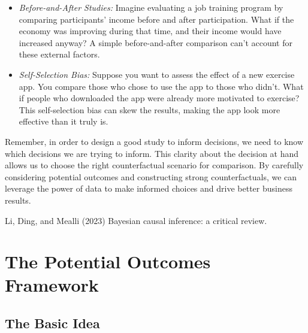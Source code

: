 \documentclass[
  letterpaper,
  DIV=11,
  numbers=noendperiod]{scrreprt}
\begin{document}
\begin{itemize}
\item
  \emph{Before-and-After Studies:} Imagine evaluating a job training
  program by comparing participants' income before and after
  participation. What if the economy was improving during that time, and
  their income would have increased anyway? A simple before-and-after
  comparison can't account for these external factors.
\item
  \emph{Self-Selection Bias:} Suppose you want to assess the effect of a
  new exercise app. You compare those who chose to use the app to those
  who didn't. What if people who downloaded the app were already more
  motivated to exercise? This self-selection bias can skew the results,
  making the app look more effective than it truly is.
\end{itemize}

Remember, in order to design a good study to inform decisions, we need
to know which decisions we are trying to inform. This clarity about the
decision at hand allows us to choose the right counterfactual scenario
for comparison. By carefully considering potential outcomes and
constructing strong counterfactuals, we can leverage the power of data
to make informed choices and drive better business results.

\begin{tcolorbox}[enhanced jigsaw, colframe=quarto-callout-tip-color-frame, left=2mm, toprule=.15mm, colbacktitle=quarto-callout-tip-color!10!white, title=\textcolor{quarto-callout-tip-color}{\faLightbulb}\hspace{0.5em}{Learn more}, coltitle=black, rightrule=.15mm, leftrule=.75mm, colback=white, arc=.35mm, bottomtitle=1mm, bottomrule=.15mm, breakable, titlerule=0mm, opacitybacktitle=0.6, toptitle=1mm, opacityback=0]

Li, Ding, and Mealli (2023) Bayesian causal inference: a critical
review.

\end{tcolorbox}

\chapter{The Potential Outcomes
Framework}\label{the-potential-outcomes-framework}

\section{The Basic Idea}\label{the-basic-idea}
\end{document}
